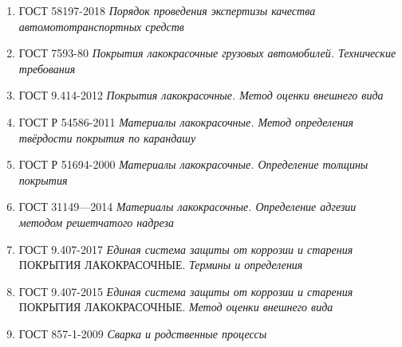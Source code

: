 \begin{enumerate}
%
\item ГОСТ 58197-2018 \emph{Порядок проведения экспертизы качества автомототранспортных средств}
\item ГОСТ 7593-80 \emph{Покрытия лакокрасочные грузовых автомобилей. Технические требования}
\item ГОСТ 9.414-2012 \emph{Покрытия лакокрасочные. Метод оценки внешнего вида}
\item ГОСТ Р 54586-2011 \emph{Материалы лакокрасочные. Метод определения твёрдости покрытия по 	карандашу}
\item ГОСТ Р 51694-2000 \emph{Материалы лакокрасочные. Определение толщины покрытия}
\item ГОСТ 31149—2014 \emph{Материалы лакокрасочные. Определение адгезии методом решетчатого  надреза}
\item ГОСТ 9.407-2017 \emph{Единая система защиты от коррозии и старения} ПОКРЫТИЯ ЛАКОКРАСОЧНЫЕ. \emph {Термины и определения}
\item ГОСТ 9.407-2015 \emph{Единая система защиты от коррозии и старения} ПОКРЫТИЯ ЛАКОКРАСОЧНЫЕ. \emph {Метод оценки внешнего вида}
\item ГОСТ 857-1-2009 \emph{Сварка и родственные процессы}
%
%
%
%
%
%

\end{enumerate}
